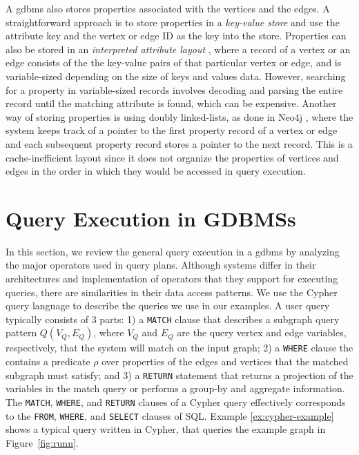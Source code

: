 A \gls{gdbms} also stores properties associated with the vertices and the edges. A straightforward approach is to store properties in a \emph{key-value store} \cite{dgraph} and use the attribute key and the vertex or edge ID as the key into the store. Properties can also be stored in an \emph{interpreted attribute layout} \cite{beckmann:sparse}, where a record of a vertex or an edge consists of the the key-value pairs of that particular vertex or edge, and is variable-sized depending on the size of keys and values data. However, searching for a property in variable-sized records involves decoding and parsing the entire record until the matching attribute is found, which can be expensive. Another way of storing properties is using doubly linked-lists, as done in Neo4j \cite{neo4j}, where the system keeps track of a pointer to the first property record of a vertex or edge and each subsequent property record stores a pointer to the next record. This is a cache-inefficient layout since it does not organize the properties of vertices and edges in the order in which they would be accessed in query execution. 

\section{Query Execution in GDBMSs}
\label{sec:operators}

In this section, we review the general query execution in a \gls{gdbms} by analyzing the major operators used in query plans. Although systems differ in their architectures and implementation of operators that they support for executing queries, there are similarities in their data access patterns. We use the Cypher query language \cite{cypher} to describe the queries we use in our examples. A user query typically consists of 3 parts: 1) a \texttt{MATCH} clause that describes a subgraph query pattern $Q(V_Q, E_Q)$, where $V_Q$ and $E_Q$ are the query vertex and edge variables, respectively, that the system will match on the input graph; 2) a \texttt{WHERE} clause the contains a predicate $\rho$ over properties of the edges and vertices that the matched subgraph must satisfy; and 3) a \texttt{RETURN} statement that returns a projection of the variables in the match query or performs a group-by and aggregate information. The \texttt{MATCH}, \texttt{WHERE}, and \texttt{RETURN} clauses of a Cypher query effectively corresponds to the \texttt{FROM}, \texttt{WHERE}, and \texttt{SELECT} clauses of SQL. Example \ref{ex:cypher-example} shows a typical query written in Cypher, that queries the example graph in Figure~\ref{fig:runn}.

